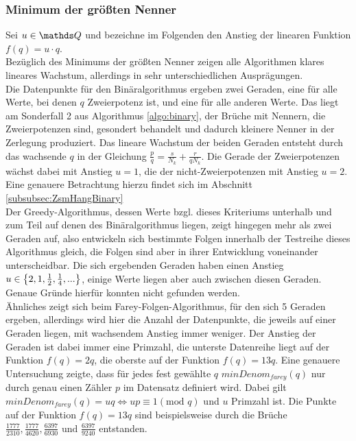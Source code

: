 \subsubsection{Minimum der größten Nenner}
Sei $u \in \Q$ und bezeichne im Folgenden den Anstieg der linearen Funktion $f(q)=u \cdot q$.\\
Bezüglich des Minimums der größten Nenner zeigen alle Algorithmen klares lineares Wachstum, allerdings in sehr unterschiedlichen Ausprägungen.\\ 
Die Datenpunkte für den Binäralgorithmus ergeben zwei Geraden, eine für alle Werte, bei denen $q$ Zweierpotenz ist, und eine für alle anderen Werte. Das liegt am Sonderfall 2 aus Algorithmus \ref{algo:binary}, der Brüche mit Nennern, die Zweierpotenzen sind, gesondert behandelt und dadurch kleinere Nenner in der Zerlegung produziert. Das lineare Wachstum der beiden Geraden entsteht durch das wachsende $q$ in der Gleichung $\frac{p}{q} = \frac{s}{N_k} + \frac{r}{qN_k}$. Die Gerade der Zweierpotenzen wächst dabei mit Anstieg $u = 1$, die der nicht-Zweierpotenzen mit Anstieg $u=2$. Eine genauere Betrachtung hierzu findet sich im Abschnitt \ref{subsubsec:ZsmHangBinary}\\
Der Greedy-Algorithmus, dessen Werte bzgl. dieses Kriteriums unterhalb und zum Teil auf denen des Binäralgorithmus liegen, zeigt hingegen mehr als zwei Geraden auf, also entwickeln sich bestimmte Folgen innerhalb der Testreihe dieses Algorithmus gleich, die Folgen sind aber in ihrer Entwicklung voneinander unterscheidbar. Die sich ergebenden Geraden haben einen Anstieg $u \in \left\{ 2, 1, \frac{1}{2}, \frac{1}{4}, ... \right\}$, einige Werte liegen aber auch zwischen diesen Geraden. Genaue Gründe hierfür konnten nicht gefunden werden.\\
Ähnliches zeigt sich beim Farey-Folgen-Algorithmus, für den sich 5 Geraden ergeben, allerdings wird hier die Anzahl der Datenpunkte, die jeweils auf einer Geraden liegen, mit wachsendem Anstieg immer weniger. Der Anstieg der Geraden ist dabei immer eine Primzahl, die unterste Datenreihe liegt auf der Funktion $f(q)=2q$, die oberste auf der Funktion $f(q) = 13q$. Eine genauere Untersuchung zeigte, dass für jedes fest gewählte $q$ $minDenom_{farey}(q)$ nur durch genau einen Zähler $p$ im Datensatz definiert wird. Dabei gilt $minDenom_{farey}(q) = uq \Leftrightarrow up \equiv 1 (\text{mod } q)$ und $u$ Primzahl ist. Die Punkte auf der Funktion $f(q) = 13q$ sind beispielsweise durch die Brüche $\frac{1777}{2310}, \frac{1777}{4620}, \frac{6397}{6930} \text{ und } \frac{6397}{9240}$ entstanden.
